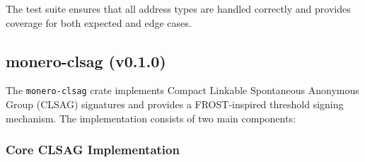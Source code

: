 The test suite ensures that all address types are handled correctly and provides coverage for both expected and edge cases.  


\subsection{monero-clsag (v0.1.0)}
The \texttt{monero-clsag} crate implements Compact Linkable Spontaneous Anonymous Group (CLSAG) signatures and provides a FROST-inspired threshold signing mechanism.  
The implementation consists of two main components:

\subsubsection{Core CLSAG Implementation}
